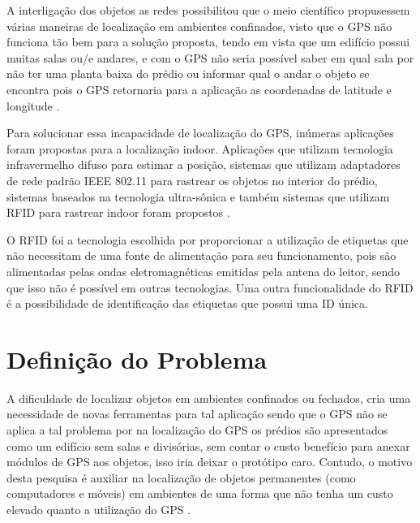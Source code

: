 A interligação dos objetos as redes possibilitou que o meio científico propusessem várias maneiras de localização em ambientes
confinados, visto que o GPS não funciona tão bem para a solução proposta, tendo em vista que um edifício possui
muitas salas ou/e andares, e com o GPS não seria possível saber em qual sala por não ter uma planta baixa do prédio ou
informar qual o andar o objeto se encontra pois o GPS retornaria para a aplicação as coordenadas de latitude e longitude \cite{rfid2009review}.


Para solucionar essa incapacidade de localização do GPS, inúmeras aplicações foram propostas para a localização indoor.
Aplicações que utilizam tecnologia infravermelho difuso para estimar a posição, sistemas que utilizam adaptadores de rede
padrão IEEE 802.11 para rastrear os objetos no interior do prédio, sistemas baseados na tecnologia ultra-sônica e
também sistemas que utilizam RFID para rastrear indoor foram propostos \cite{mechanismRFID2006}.


O RFID foi a tecnologia escolhida por proporcionar a utilização de etiquetas que não necessitam de uma fonte de alimentação
para seu funcionamento, pois são alimentadas pelas ondas eletromagnéticas emitidas pela antena do leitor, sendo que isso não
é possível em outras tecnologias. Uma outra funcionalidade do RFID é a possibilidade de identificação das etiquetas que possui
uma ID única.



\section{Definição do Problema}
A dificuldade de localizar objetos em ambientes confinados ou fechados, cria uma necessidade de novas ferramentas para
tal aplicação sendo que o GPS não se aplica a tal problema por na localização do GPS os prédios são apresentados como um edifício sem salas e divisórias, sem contar o custo benefício para anexar módulos de GPS aos objetos, isso iria deixar o protótipo caro. Contudo, o motivo desta pesquisa é auxiliar na localização de objetos permanentes (como computadores e móveis)
em ambientes de uma forma que não tenha um custo elevado quanto a utilização do
GPS \cite{mechanismRFID2006}.

